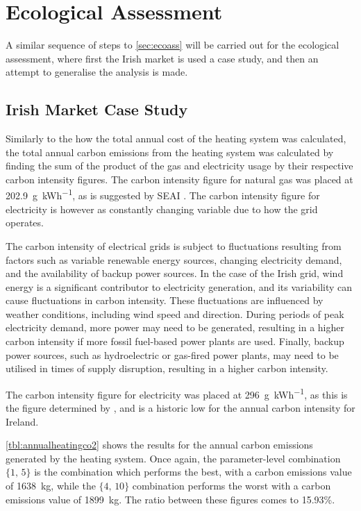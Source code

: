 \section{Ecological Assessment}

A similar sequence of steps to \cref{sec:ecoass} will be carried out for the ecological assessment, where first the Irish market is used a case study, and then an attempt to generalise the analysis is made. 


\subsection{Irish Market Case Study} \label{subsec:irishmarket}
Similarly to the how the total annual cost of the heating system was calculated, the total annual carbon emissions from the heating system was calculated by finding the sum of the product of the gas and electricity usage by their respective carbon intensity figures. The carbon intensity figure for natural gas was placed at \qty{202.9}{\gram\per\kWh}, as is suggested by SEAI \cite{seai_conversion_nodate}. The carbon intensity figure for electricity is however as constantly changing variable due to how the grid operates. 

The carbon intensity of electrical grids is subject to fluctuations resulting from factors such as variable renewable energy sources, changing electricity demand, and the availability of backup power sources. In the case of the Irish grid, wind energy is a significant contributor to electricity generation, and its variability can cause fluctuations in carbon intensity. These fluctuations are influenced by weather conditions, including wind speed and direction. During periods of peak electricity demand, more power may need to be generated, resulting in a higher carbon intensity if more fossil fuel-based power plants are used. Finally, backup power sources, such as hydroelectric or gas-fired power plants, may need to be utilised in times of supply disruption, resulting in a higher carbon intensity.

The carbon intensity figure for electricity was placed at \qty{296}{\gram\per\kWh}, as this is the figure determined by \citeauthor{seai_energy_2021}\cite{seai_energy_2021}, and is a historic low for the annual carbon intensity for Ireland. 

\cref{tbl:annualheatingco2} shows the results for the annual carbon emissions generated by the heating system. Once again, the parameter-level combination $\{1\text{, }5\}$ is the combination which performs the best, with a carbon emissions value of \qty{1638}{\kilo\gram}, while the $\{4\text{, }10\}$ combination performs the worst with a carbon emissions value of \qty{1899}{\kilo\gram}. The ratio between these figures comes to 15.93\%. 

